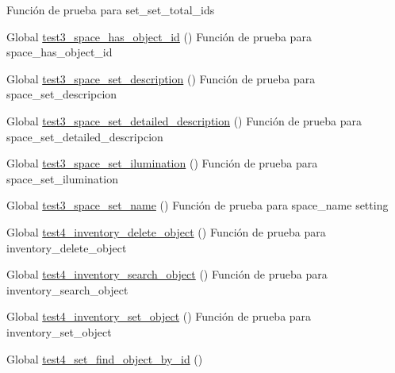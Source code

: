 \begin{DoxyRefList}
%
Función de prueba para set\+\_\+set\+\_\+total\+\_\+ids  
\item[Global \mbox{\hyperlink{space__test_8c_ab520b6fd93b9e83d998cd932afd1b78a}{test3\+\_\+space\+\_\+has\+\_\+object\+\_\+id}} ()]\label{test__test000277}%
%
Función de prueba para space\+\_\+has\+\_\+object\+\_\+id  
\item[Global \mbox{\hyperlink{space__test_8c_a2599e2fdd9abd61c410faeca649402e6}{test3\+\_\+space\+\_\+set\+\_\+description}} ()]\label{test__test000284}%
%
Función de prueba para space\+\_\+set\+\_\+descripcion  
\item[Global \mbox{\hyperlink{space__test_8c_a9bd3ad5b0c9b3e4a339fb1b0ff932ed2}{test3\+\_\+space\+\_\+set\+\_\+detailed\+\_\+description}} ()]\label{test__test000294}%
%
Función de prueba para space\+\_\+set\+\_\+detailed\+\_\+descripcion  
\item[Global \mbox{\hyperlink{space__test_8c_a89b87fffd76e94c927cc560096d07188}{test3\+\_\+space\+\_\+set\+\_\+ilumination}} ()]\label{test__test000289}%
%
Función de prueba para space\+\_\+set\+\_\+ilumination  
\item[Global \mbox{\hyperlink{space__test_8c_aa24a337830006e33706ab6ac1c416b47}{test3\+\_\+space\+\_\+set\+\_\+name}} ()]\label{test__test000248}%
%
Función de prueba para space\+\_\+name setting  
\item[Global \mbox{\hyperlink{inventory__test_8c_a260ed194aa039d7cf055944a3bc1c2e6}{test4\+\_\+inventory\+\_\+delete\+\_\+object}} ()]\label{test__test000083}%
%
Función de prueba para inventory\+\_\+delete\+\_\+object  
\item[Global \mbox{\hyperlink{inventory__test_8c_ae04f282fdf617aff63c4207ee1e41d1e}{test4\+\_\+inventory\+\_\+search\+\_\+object}} ()]\label{test__test000094}%
%
Función de prueba para inventory\+\_\+search\+\_\+object  
\item[Global \mbox{\hyperlink{inventory__test_8c_a64b2d92f50bb388e75bb03355aa8b5eb}{test4\+\_\+inventory\+\_\+set\+\_\+object}} ()]\label{test__test000071}%
%
Función de prueba para inventory\+\_\+set\+\_\+object  
\item[Global \mbox{\hyperlink{set__test_8c_aa8ba0e1129a84844e4621d3ca86008ce}{test4\+\_\+set\+\_\+find\+\_\+object\+\_\+by\+\_\+id}} ()]\label{test__test000231}%
%

\end{DoxyRefList}
